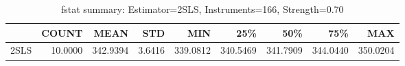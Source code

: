 \begin{table}[ht]
\centering
\caption{fstat summary: Estimator=2SLS, Instruments=166, Strength=0.70}
\begin{tabular}{lrrrrrrrr}
\toprule
 & COUNT & MEAN & STD & MIN & 25\% & 50\% & 75\% & MAX \\
\midrule
2SLS & 10.0000 & 342.9394 & 3.6416 & 339.0812 & 340.5469 & 341.7909 & 344.0440 & 350.0204 \\
\bottomrule
\end{tabular}
\end{table}

